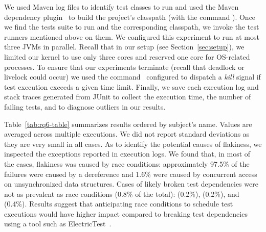 We used Maven log files to identify test classes to run and used the
Maven dependency plugin~\cite{maven-dep} to build the project's
classpath (with the command ).
Once we find the tests suite to run and the corresponding classpath,
we invoke the test runners mentioned above on them.  We configured
this experiment to run at most three JVMs in parallel.  Recall that in
our setup (see Section~\ref{sec:setup}), we limited our kernel to use
only three cores and reserved one core for OS-related processes.  To
ensure that our experiments terminate (recall that deadlock or
livelock could occur) we used the 
command~\cite{timeout-cmd} configured to dispatch a \emph{kill} signal
if test execution exceeds a given time limit. Finally, we save each
execution log and stack traces generated from JUnit to collect the
execution time, the number of failing tests, and to diagnose outliers
in our results.

\sloppy Table~\ref{tab:rq6-table} summarizes results ordered by
subject's name.  Values are averaged across multiple executions.  We
did not report standard deviations as they are very small in all
cases.  As to identify the potential causes of flakiness, we inspected
the exceptions reported in execution logs. We found that, in most
of the cases, flakiness was caused by race conditions: approximately
97.5\% of the failures were caused by a  dereference and 1.6\% were
caused by concurrent access on unsynchronized data structures.  Cases of likely
broken test dependencies were not as prevalent as race conditions
(0.8\% of the total):  (0.2\%),
 (0.2\%), and
 (0.4\%). Results suggest that
anticipating race conditions to schedule test executions would have
higher impact compared to breaking test dependencies using a tool such
as ElectricTest~\cite{bell-etal-esecfse2015}.

